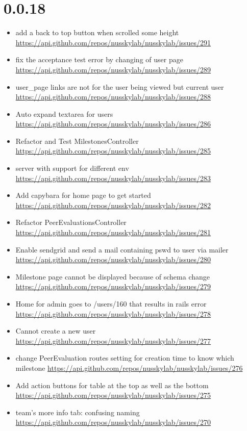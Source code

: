 {\section{0.0.18}
\begin{itemize}[noitemsep]
    \item add a back to top button when scrolled some height \url{https://api.github.com/repos/nusskylab/nusskylab/issues/291} 
    \item fix the acceptance test error by changing of user page \url{https://api.github.com/repos/nusskylab/nusskylab/issues/289} 
    \item user\_page links are not for the user being viewed but current user \url{https://api.github.com/repos/nusskylab/nusskylab/issues/288} 
    \item Auto expand textarea for users \url{https://api.github.com/repos/nusskylab/nusskylab/issues/286} 
    \item Refactor and Test MilestonesController \url{https://api.github.com/repos/nusskylab/nusskylab/issues/285} 
    \item server with support for different env \url{https://api.github.com/repos/nusskylab/nusskylab/issues/283} 
    \item Add capybara for home page to get started \url{https://api.github.com/repos/nusskylab/nusskylab/issues/282} 
    \item Refactor PeerEvaluationsController \url{https://api.github.com/repos/nusskylab/nusskylab/issues/281} 
    \item Enable sendgrid and send a mail containing pswd to user via mailer \url{https://api.github.com/repos/nusskylab/nusskylab/issues/280} 
    \item Milestone page cannot be displayed because of schema change \url{https://api.github.com/repos/nusskylab/nusskylab/issues/279} 
    \item Home for admin goes to /users/160 that results in rails error \url{https://api.github.com/repos/nusskylab/nusskylab/issues/278} 
    \item Cannot create a new user \url{https://api.github.com/repos/nusskylab/nusskylab/issues/277} 
    \item change PeerEvaluation routes setting for creation time to know which milestone \url{https://api.github.com/repos/nusskylab/nusskylab/issues/276} 
    \item Add action buttons for table at the top as well as the bottom \url{https://api.github.com/repos/nusskylab/nusskylab/issues/275} 
    \item team's more info tab: confusing naming \url{https://api.github.com/repos/nusskylab/nusskylab/issues/270} 

\end{itemize}}
